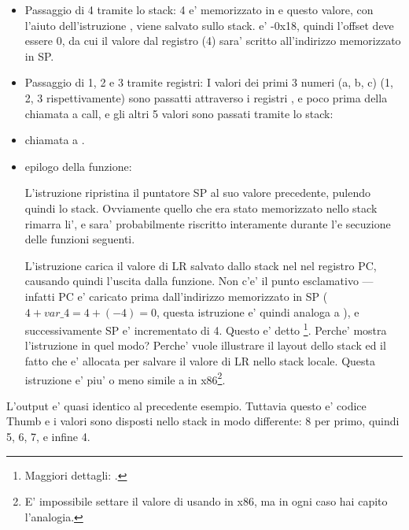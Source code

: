 \begin{itemize}
\item Passaggio di 4 tramite lo stack: 4 e' memorizzato in  e questo valore, con l'aiuto dell'istruzione , viene salvato sullo stack.
 e' -0x18, quindi l'offset deve essere 0, da cui il valore dal registro  (4) sara' scritto all'indirizzo memorizzato in \ac{SP}.

\item Passaggio di 1, 2 e 3 tramite registri:
I valori dei primi 3 numeri (a, b, c) (1, 2, 3 rispettivamente) sono passatti attraverso i registri
,  e 
poco prima della chiamata a \printf call, e gli altri 5 valori sono passati tramite lo stack:

\item chiamata a \printf.

\item epilogo della funzione:

L'istruzione  ripristina il puntatore \ac{SP} al suo valore precedente, pulendo quindi lo stack.
Ovviamente quello che era stato memorizzato nello stack rimarra li', e sara' probabilmente riscritto interamente durante l'e
secuzione delle funzioni seguenti.

L'istruzione  carica il valore di \ac{LR} salvato dallo stack nel nel registro \ac{PC}, causando quindi
l'uscita dalla funzione.
Non c'e' il punto esclamativo ---infatti \ac{PC} e' caricato prima dall'indirizzo memorizzato in \ac{SP} ($4+var\_4=4+(-4)=0$, questa istruzione e' quindi analoga a ), e successivamente \ac{SP} e' incrementato di 4.
Questo e' detto \footnote{Maggiori dettagli: .}.
Perche' \IDA mostra l'istruzione in quel modo?
Perche' vuole illustrare il layout dello stack ed il fatto che  e' allocata per salvare il valore di \ac{LR} nello stack locale.
Questa istruzione e' piu' o meno simile a  in x86\footnote{E' impossibile settare il valore di  usando \POP in x86, ma in ogni caso hai capito l'analogia.}.

\end{itemize}

\myparagraph{\OptimizingKeilVI: \ThumbMode}



L'output e' quasi identico al precedente esempio. Tuttavia questo e' codice Thumb e i valori sono disposti nello stack in modo differente:
8 per primo, quindi 5, 6, 7, e infine 4.


